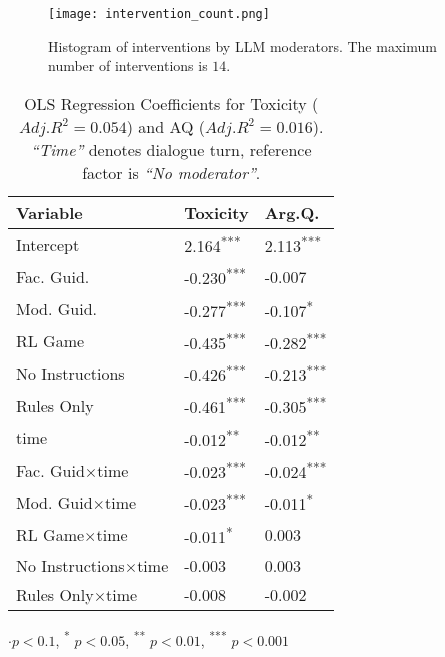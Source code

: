 \begin{figure}
	\centering
	\texttt{[image: intervention\_count.png]}
	\caption{Histogram of interventions by \ac{LLM} moderators. The maximum number of interventions is $14$.}
	\label{fig::intervention_count}
\end{figure}

\begin{table}[htbp]
    \centering
    \begin{tabular}{lll}
        \toprule
        \textbf{Variable} & \textbf{Toxicity} & \textbf{Arg.Q.} \\
        \midrule
        Intercept & 2.164\textsuperscript{***} & 2.113\textsuperscript{***} \\
        Fac. Guid. & -0.230\textsuperscript{***} & -0.007 \\
        Mod. Guid. & -0.277\textsuperscript{***} & -0.107\textsuperscript{*} \\
        \ac{RL} Game & -0.435\textsuperscript{***} & -0.282\textsuperscript{***} \\
        No Instructions & -0.426\textsuperscript{***} & -0.213\textsuperscript{***} \\
        Rules Only & -0.461\textsuperscript{***} & -0.305\textsuperscript{***} \\
        time & -0.012\textsuperscript{**} & -0.012\textsuperscript{**} \\
        Fac. Guid$\times$time & -0.023\textsuperscript{***} & -0.024\textsuperscript{***} \\
        Mod. Guid$\times$time & -0.023\textsuperscript{***} & -0.011\textsuperscript{*} \\
        \ac{RL} Game$\times$time & -0.011\textsuperscript{*} & 0.003 \\
        No Instructions$\times$time & -0.003 & 0.003 \\
        Rules Only$\times$time & -0.008 & -0.002 \\
        \bottomrule
    \end{tabular}
    \small
    $\cdot p<0.1$, \textsuperscript{*} $p<0.05$, \textsuperscript{**} $p<0.01$, \textsuperscript{***} $p<0.001$
    \normalsize
    \caption{OLS Regression Coefficients for Toxicity ($Adj. R^2=0.054$) and \ac{AQ} ($Adj. R^2=0.016$). \textit{“Time”} denotes dialogue turn, reference factor is \textit{“No moderator”}.}
    \label{tab:timeseries}
\end{table}




